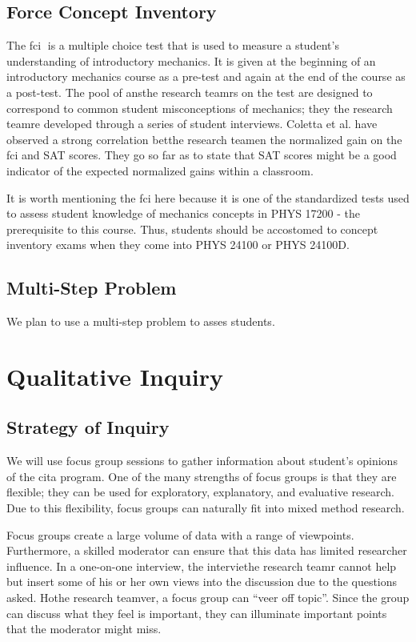 \subsection{Force Concept Inventory}

The \gls{fci}􏰁 is a multiple choice test that is used to measure a student's understanding of introductory mechanics. It is given at the beginning of an introductory mechanics course as a pre-test and again at the end of the course as a post-test. The pool of ansthe research teamrs on the test are designed to correspond to common student misconceptions of mechanics; they the research teamre developed through a series of student interviews\cite{hestenes1992}. Coletta et al. have observed a strong correlation betthe research teamen the normalized gain on the \gls{fci} and SAT scores. They go so far as to state that SAT scores might be a good indicator of the expected normalized gains within a classroom\cite{coletta2007}.

It is worth mentioning the \gls{fci} here because it is one of the standardized tests used to assess student knowledge of mechanics concepts in PHYS 17200 - the prerequisite to this course. Thus, students should be accostomed to concept inventory exams when they come into PHYS 24100 or PHYS 24100D.

\subsection{Multi-Step Problem}

We plan to use a multi-step problem to asses students\cite{sherwood2005, chabay2014}.

\section{Qualitative Inquiry}

\subsection{Strategy of Inquiry}

We will use focus group sessions to gather information about student's opinions of the \gls{cita} program. One of the many strengths of focus groups is that they are flexible; they can be used for exploratory, explanatory, and evaluative research. Due to this flexibility, focus groups can naturally fit into mixed method research.

Focus groups create a large volume of data with a range of viewpoints. Furthermore, a skilled moderator can ensure that this data has limited researcher influence. In a one-on-one interview, the interviethe research teamr cannot help but insert some of his or her own views into the discussion due to the questions asked. Hothe research teamver, a focus group can “veer off topic”. Since the group can discuss what they feel is important, they can illuminate important points that the moderator might miss.


